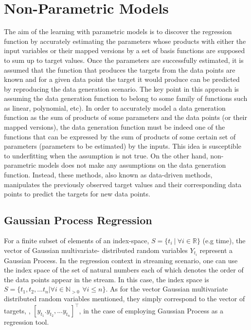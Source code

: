\section{Non-Parametric Models}

The aim of the learning with parametric models is to discover the regression function by accurately estimating the parameters whose products with either the input variables or their mapped versions by a set of basis functions are supposed to sum up to target values. Once the parameters are successfully estimated, it is assumed that the function that produces the targets from the data points are known and for a given data point the target it would produce can be predicted by reproducing the data generation scenario. The key point in this approach is assuming the data generation function to belong to some family of functions such as linear, polynomial, etc). In order to accurately model a data generation function as the sum of products of some parameters and the data points (or their mapped versions), the data generation function must be indeed one of the functions that can be expressed by the sum of products of some certain set of parameters (parameters to be estimated) by the inputs. This idea is susceptible to underfitting when the assumption is not true. On the other hand, non-parametric models does not make any assumptions on the data generation function. Instead, these methods, also known as data-driven methods, manipulates the previously observed target values and their corresponding data points to predict the targets for new data points.

\subsection{Gaussian Process Regression}
\label{subsection:gpreg}

For a finite subset of elements of an index-space, $S = \{t_i \ | \ \forall i \in \mathbb{R}\}$ (e.g time), the vector of Gaussian multivariate- distributed random variables $Y_{t_i}$ represent a Gaussian Process. In the regression context in streaming scenario, one can use the index space of the set of natural numbers each of which denotes the order of the data points appear in the stream. In this case, the index space is $S = \{t_1, t_2, ... t_n | \forall i \in \mathbb{N}_{> 0}\, \ \forall i \leq n \}$. As for the vector Gaussian multivariate distributed random variables mentioned, they simply correspond to the vector of targets, , $[y_{t_1}. y_{t_2}, ... y_{t_n}]^{\top}$, in the case of employing Gaussian Process as a regression tool.

